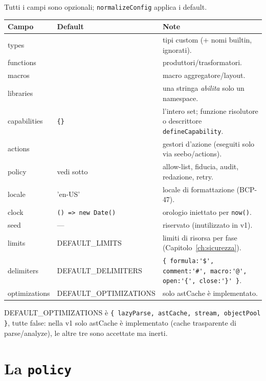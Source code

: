 \documentclass[11pt,a4paper]{book}
\let\code\lstinline
\newcommand{\ic}[1]{{\ttfamily #1}}
\theoremstyle{definition}
\begin{document}
{{{{Tutti i campi sono opzionali; \code|normalizeConfig| applica i default.

\begin{center}
\small
\begin{tabular}{@{}l l p{6.6cm}@{}}
\toprule
\textbf{Campo} & \textbf{Default} & \textbf{Note} \\
\midrule
\ic{types} & \ic{[]} & tipi custom (+ nomi builtin, ignorati). \\
\ic{functions} & \ic{[]} & produttori/trasformatori. \\
\ic{macros} & \ic{[]} & macro aggregatore/layout. \\
\ic{libraries} & \ic{[]} & una stringa \emph{abilita} solo un namespace. \\
\ic{capabilities} & \verb|{}| & l'intero set; funzione risolutore o descrittore
\code|defineCapability|. \\
\ic{actions} & \ic{[]} & gestori d'azione (eseguiti solo via \ic{seebo/actions}). \\
\ic{policy} & vedi sotto & allow-list, fiducia, audit, redazione, retry. \\
\ic{locale} & \ic{'en-US'} & locale di formattazione (BCP-47). \\
\ic{clock} & \code|() => new Date()| & orologio iniettato per \code|now()|. \\
\ic{seed} & --- & riservato (inutilizzato in v1). \\
\ic{limits} & \ic{DEFAULT\_LIMITS} & limiti di risorsa per fase (Capitolo~\ref{ch:sicurezza}). \\
\ic{delimiters} & \ic{DEFAULT\_DELIMITERS} & \verb|{ formula:'$', comment:'#', macro:'@', open:'{', close:'}' }|. \\
\ic{optimizations} & \ic{DEFAULT\_OPTIMIZATIONS} & solo \ic{astCache} è implementato. \\
\bottomrule
\end{tabular}
\end{center}

\ic{DEFAULT\_OPTIMIZATIONS} è \verb|{ lazyParse, astCache, stream, objectPool }|,
tutte \ic{false}: nella v1 solo \ic{astCache} è implementato (cache trasparente di
parse/analyze), le altre tre sono accettate ma inerti.

\section{La \texttt{policy}}

}}}}
\end{document}
